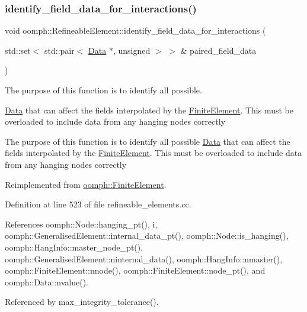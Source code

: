 \subsubsection{\texorpdfstring{identify\+\_\+field\+\_\+data\+\_\+for\+\_\+interactions()}{identify\_field\_data\_for\_interactions()}}
{\footnotesize\ttfamily void oomph\+::\+Refineable\+Element\+::identify\+\_\+field\+\_\+data\+\_\+for\+\_\+interactions (\begin{DoxyParamCaption}\item[{std\+::set$<$ std\+::pair$<$ \hyperlink{classoomph_1_1Data}{Data} $\ast$, unsigned $>$ $>$ \&}]{paired\+\_\+field\+\_\+data }\end{DoxyParamCaption})\hspace{0.3cm}{\ttfamily [virtual]}}



The purpose of this function is to identify all possible. 

\hyperlink{classoomph_1_1Data}{Data} that can affect the fields interpolated by the \hyperlink{classoomph_1_1FiniteElement}{Finite\+Element}. This must be overloaded to include data from any hanging nodes correctly

The purpose of this function is to identify all possible \hyperlink{classoomph_1_1Data}{Data} that can affect the fields interpolated by the \hyperlink{classoomph_1_1FiniteElement}{Finite\+Element}. This must be overloaded to include data from any hanging nodes correctly 

Reimplemented from \hyperlink{classoomph_1_1FiniteElement_aee5883ba2e464257c3a9c775d8e24c02}{oomph\+::\+Finite\+Element}.



Definition at line 523 of file refineable\+\_\+elements.\+cc.



References oomph\+::\+Node\+::hanging\+\_\+pt(), i, oomph\+::\+Generalised\+Element\+::internal\+\_\+data\+\_\+pt(), oomph\+::\+Node\+::is\+\_\+hanging(), oomph\+::\+Hang\+Info\+::master\+\_\+node\+\_\+pt(), oomph\+::\+Generalised\+Element\+::ninternal\+\_\+data(), oomph\+::\+Hang\+Info\+::nmaster(), oomph\+::\+Finite\+Element\+::nnode(), oomph\+::\+Finite\+Element\+::node\+\_\+pt(), and oomph\+::\+Data\+::nvalue().



Referenced by max\+\_\+integrity\+\_\+tolerance().

\mbox{\label{classoomph_1_1RefineableElement_a61ae74d94be7abc7231f34f3322f8e13}} 

